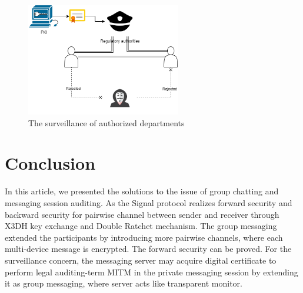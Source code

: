 \documentclass[11pt,en]{elegantpaper}
\begin{document}
\begin{figure}[H]
    \centering
    \includegraphics[width=0.6\textwidth]{image/suv}
    \caption{The surveillance of authorized departments}
    \label{suv}
\end{figure}


\section{Conclusion}
In this article, we presented the solutions to the issue of group chatting and messaging session auditing. As the Signal protocol realizes forward security and backward security for pairwise channel between sender and receiver through X3DH key exchange and Double Ratchet mechanism. The group messaging extended the participants by introducing more pairwise channels, where each multi-device message is encrypted. The forward security can be proved. For the surveillance concern, the messaging server may acquire digital certificate to perform legal auditing-term MITM in the private messaging session by extending it as group messaging, where server acts like transparent monitor.


\end{document}
